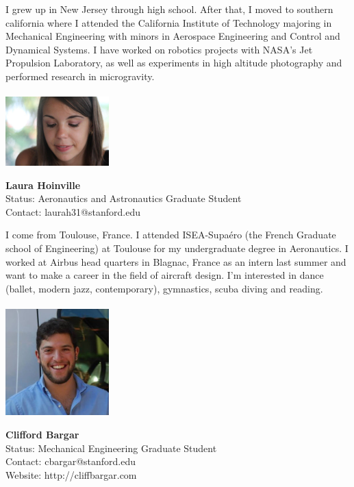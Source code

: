 I grew up in New Jersey through high school. After that, I moved to southern california where I attended the California Institute of Technology majoring in Mechanical Engineering with minors in Aerospace Engineering and Control and Dynamical Systems. I have worked on robotics projects with NASA's Jet Propulsion Laboratory, as well as experiments in high altitude photography and performed research in microgravity.
\\ \\


\noindent \includegraphics[width=40mm]{images/image012bis}
\parbox[b]{0.6\textwidth}{\textbf{Laura Hoinville}\\
Status: Aeronautics and Astronautics Graduate Student\\
Contact:  laurah31@stanford.edu \\
}

I come from Toulouse, France. I attended ISEA-Supa\'{e}ro (the French Graduate school of Engineering) at Toulouse for my undergraduate degree in Aeronautics. I worked at Airbus head quarters in Blagnac, France as an intern last summer and want to make a career in the field of aircraft design. I'm interested in dance (ballet, modern jazz, contemporary), gymnastics, scuba diving and reading.
\\ \\


\noindent \includegraphics[width=40mm]{images/cliff.jpg}
\parbox[b]{0.6\textwidth}{\textbf{Clifford Bargar}\\
Status: Mechanical Engineering Graduate Student\\
Contact: cbargar@stanford.edu \\
Website: http://cliffbargar.com \\
}

